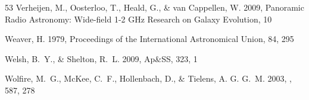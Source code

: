 \documentclass[12pt]{emulateapj}
\begin{document}
\begin{thebibliography}{53}
Verheijen, M., Oosterloo, T., Heald, G., \& van Cappellen, W. 2009, Panoramic Radio Astronomy: Wide-field 1-2 GHz Research on Galaxy Evolution, 10

Weaver, H. 1979, Proceedings of the International Astronomical Union, 84, 295

Welsh, B.~Y., \& Shelton, R.~L. 2009, Ap\&SS, 323, 1

Wolfire, M.~G., McKee, C.~F., Hollenbach, D., \& Tielens, A. G. G.~M. 2003,
  \apj, 587, 278

\end{thebibliography}
\end{document}

